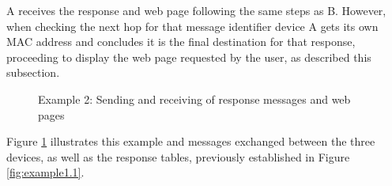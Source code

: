 A receives the response and web page following the same steps as B. However, when checking the next hop for that message identifier device A gets its own \gls{MAC} address and concludes it is the final destination for that response, proceeding to display the web page requested by the user, as described this subsection.

\begin{figure}[ht]
   \noindent{}
	\caption{\label{fig:example1.2} Example 2: Sending and receiving of response messages and web pages}
\end{figure}

Figure \ref{fig:example1.2} illustrates this example and messages exchanged between the three devices, as well as the response tables, previously established in Figure \ref{fig:example1.1}.











